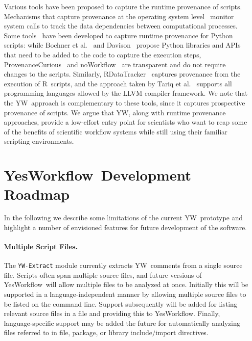 \documentclass{article}
\newcommand{\YW}{\textsf{YesWorkflow}}
\newcommand{\yw}{\textsf{YW}}
\newcommand{\YWT}{\textsf{YesWorkflow}}
\newcommand{\ywm}[1]{\texttt{#1}}
\newcommand{\R}{\textsf{R}}
\begin{document}
Various tools have been proposed to capture the runtime provenance of
scripts. Mechanisms that capture provenance at the operating system
level~\cite{frew2008Automatic,guo2012BURRITO,muniswamy2006Provenance}
monitor system calls to track the data dependencies between
computational processes. Some
tools~\cite{bochner2008Python,davison2012Automated,huq2013ProvenanceCurious,murta2014noWorkflow}
have been developed to capture runtime provenance for Python scripts:
while Bochner et al.~\cite{bochner2008Python} and
Davison~\cite{davison2012Automated} propose Python libraries and APIs that
need to be added to the code to capture the execution steps,
ProvenanceCurious~\cite{huq2013ProvenanceCurious} and
noWorkflow~\cite{murta2014noWorkflow} are transparent and do not
require changes to the scripts. Similarly,
RDataTracker~\cite{Lerner2014RDataTracker} captures provenance from
the execution of \R\ scripts, and the approach taken by Tariq et
al.~\cite{Tariq2012Towards} supports all programming languages allowed
by the LLVM compiler framework. We note that the \yw\ approach is
complementary to these tools, since it captures prospective provenance
of scripts. We argue that \yw, along with runtime provenance
approaches, provide a low-effort entry point for scientists who want
to reap some of the benefits of scientific workflow systems while
still using their familiar scripting environments.


\section{\YWT\ Development Roadmap}\label{sec-conclusions}

In the following we describe some limitations of the current \yw\
prototype and highlight a number of envisioned features for future
development of the software.

\paragraph{Multiple Script Files.}

The \ywm{YW-Extract} module currently extracts \yw\ comments from a
single source file. Scripts often span multiple source files, and
future versions of \YW\ will allow multiple files to be analyzed at
once.
%
Initially this will be supported in a language-independent manner by
allowing multiple source files to be listed on the command
line. Support subsequently will be added for listing relevant source
files in a file and providing this to \YW.  Finally, language-specific
support may be added the future for automatically analyzing files
referred to in file, package, or library include/import directives.
\end{document}
